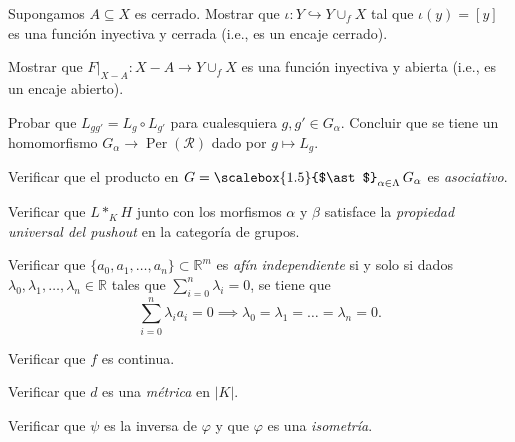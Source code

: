 \begin{ejercicio}
        Supongamos $A\subseteq X$ es cerrado. Mostrar que $\iota: Y\hookrightarrow Y\cup_f X$ tal que $\iota(y)=[y]$ es una función inyectiva y cerrada (i.e., es un encaje cerrado).
    \end{ejercicio}

\begin{ejercicio}
        Mostrar que $F|_{X-A}:X-A\to Y\cup_f X$ es una función inyectiva y abierta (i.e., es un encaje abierto).
    \end{ejercicio}

\begin{ejercicio}
Probar que $L_{g g'} = L_g \circ L_{g'}$ para cualesquiera $g, g' \in G_\alpha$. Concluir que se tiene un homomorfismo $G_\alpha \to \operatorname{Per}(\mathcal{R})$ dado por $g \mapsto L_g$.
\end{ejercicio}

\begin{ejercicio}
Verificar que el producto en $G = \mathop{\scalebox{1.5}{$\ast$}}_{\alpha \in \Lambda} G_\alpha$ es \textit{asociativo}.
\end{ejercicio}

\begin{ejercicio}
Verificar que $L{\ast}_{K} H$ junto con los morfismos $\alpha$ y $\beta$ satisface la \textit{propiedad universal del pushout} en la categoría de grupos.
\end{ejercicio}

\begin{ejercicio}
Verificar que $\{a_0, a_1, \dots, a_n\} \subset \mathbb{R}^m$ es \textit{afín independiente} si y solo si dados $\lambda_0, \lambda_1, \dots, \lambda_n \in \mathbb{R}$ tales que $\sum_{i=0}^n \lambda_i = 0$, se tiene que
\[
\sum_{i=0}^n \lambda_i a_i = 0 \implies \lambda_0 = \lambda_1 = \dots = \lambda_n = 0.
\]
\end{ejercicio}

\begin{ejercicio}
Verificar que $f$ es continua.
\end{ejercicio}

\begin{ejercicio}
Verificar que $d$ es una \textit{métrica} en $|K|$.
\end{ejercicio}

\begin{ejercicio}
Verificar que $\psi$ es la inversa de $\varphi$ y que $\varphi$ es una \textit{isometría}.
\end{ejercicio}

